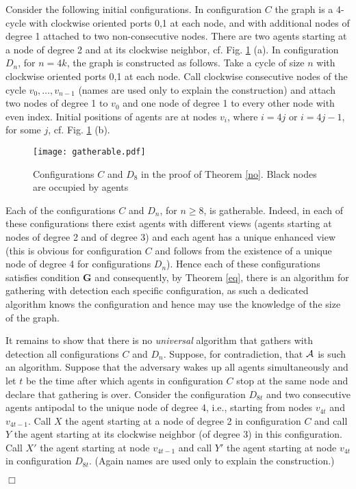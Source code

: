 \documentclass[11pt]{article}
\newcommand{\qed}{\hfill $\Box$ \bigbreak}
\newenvironment{proof}{\noindent {\bf Proof.}}{\qed}
\newcommand{\cA}{{\cal A}}
\begin{document}
\begin{proof}
Consider the following initial configurations. In configuration $C$ the graph is a 4-cycle with clockwise oriented ports 0,1 at each node, and with additional
nodes of degree 1 attached to two non-consecutive nodes. There are two agents starting at a node of degree 2 and at its clockwise neighbor, cf. Fig. 
 \ref{fig:gatherable} (a).
In configuration $D_n$, for $n=4k$, the graph is constructed as follows. Take a cycle of size $n$  with clockwise oriented ports 0,1 at each node. 
Call clockwise consecutive nodes of the cycle $v_0,\dots, v_{n-1}$ (names are used only to explain the construction) 
and attach two nodes of degree 1 to $v_0$ and one node of degree 1 to every other node with even index. Initial positions of agents are at nodes $v_i$, where 
$i=4j$ or $i=4j-1$, for some $j$,  cf. Fig. \ref{fig:gatherable} (b).

\begin{figure}[h!]
        \begin{center}
        \texttt{[image: gatherable.pdf]}
        \caption{Configurations $C$ and $D_8$ in the proof of
Theorem \ref{no}. Black nodes are occupied by agents}
        \label{fig:gatherable}
        \end{center}
\end{figure}

Each of the configurations $C$ and $D_n$, for $n \geq 8$, is gatherable. Indeed, in each of these configurations there exist agents with different views
(agents starting at nodes of degree 2 and of degree 3) and each agent has a unique enhanced view (this is obvious for configuration $C$ and follows 
from the existence of a unique node of degree 4 for configurations $D_n$). Hence each of these configurations satisfies condition {\bf G} and consequently,
by Theorem \ref{eq}, there is an algorithm for gathering with detection each specific configuration, as such a dedicated algorithm knows 
the configuration and hence may use the knowledge of the size
of the graph.

It remains to show that there is no {\em universal} algorithm that gathers with detection all configurations $C$ and $D_n$. Suppose, for contradiction, that $\cA$ is such 
an algorithm. Suppose that the adversary wakes up all agents simultaneously and let $t$ be the time after which agents in configuration $C$ stop at the same node
and declare that gathering is over. Consider the configuration $D_{8t}$ and two consecutive agents antipodal to the unique node of degree 4, i.e.,   starting from nodes
$v_{4t}$ and $v_{4t-1}$. Call $X$ the agent starting at a node of degree 2 in configuration $C$ and call $Y$ the agent starting at its clockwise neighbor (of degree 3)
in this configuration. Call $X'$ the agent starting at node $v_{4t-1}$ and call $Y'$ the agent starting at node $v_{4t}$ in configuration $D_{8t}$.
(Again names are used only to explain the construction.) 


\end{proof}
\end{document}
